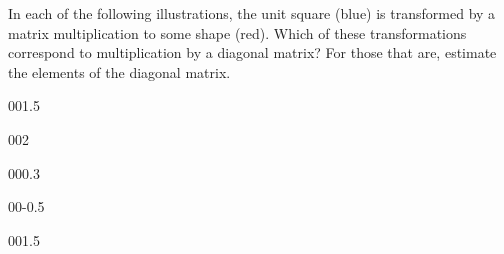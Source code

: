 \begin{exercise} \label{ex:} 
In each of the following illustrations, the unit square (blue) is transformed by a matrix multiplication to some shape (red).
Which of these transformations correspond to multiplication by a diagonal matrix?  
For those that are, estimate the elements of the diagonal matrix.
\begin{parts}
\item {}

\item {}00{1.5}

\item {}00{2}

\item {}00{0.3}

\item {}

\item {}

\item {}00{-0.5}

\item {}

\item {}00{1.5}

\item {}

\end{parts}
\end{exercise}



